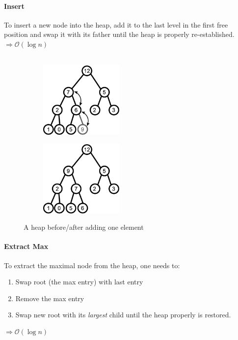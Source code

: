 \documentclass[11pt,a4paper]{article}
\begin{document}
\paragraph*{Insert} To insert a new node into the heap, add it to the last level in the first free position and swap it with its father until the heap is properly re-established. \newline
$\Rightarrow \mathcal{O}(\log n)$
\\ \\
\begin{figure}[htbp]
\centering
\begin{subfigure}
\centering
\includegraphics[width=0.45\textwidth]{inkscape/tree2.eps}
\end{subfigure}%
\begin{subfigure}
\centering
\includegraphics[width=0.45\textwidth]{inkscape/tree3.eps}
\end{subfigure}%
\caption{A heap before/after adding one element}
\label{tree2_3}
\end{figure}

\paragraph*{Extract Max} To extract the maximal node from the heap, one needs to:
\begin{enumerate}
\item Swap root (the max entry) with last entry
\item Remove the max entry
\item Swap new root with its \emph{largest} child until the heap properly is restored.
\end{enumerate}
$\Rightarrow \mathcal{O}(\log n)$
\\ \\
\end{document}
